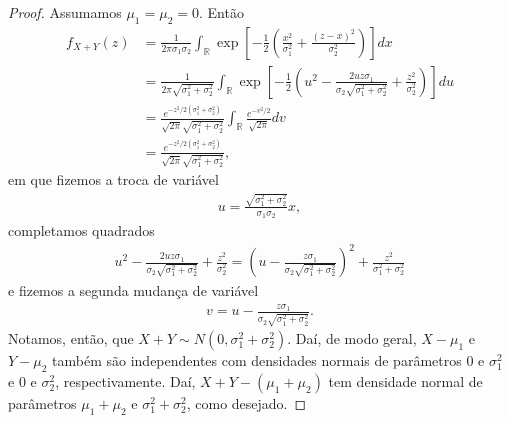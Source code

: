 \documentclass[../Notas.tex]{subfiles}
\begin{document}
\begin{proof}
Assumamos $\mu_1 = \mu_2 = 0$. Então
\begin{align*}
    f_{X+Y}(z) &= \frac{1}{2\pi\sigma_1\sigma_2}\int_{\mathbb{R}} \exp[ -\frac{1}{2}\left( \frac{x^2}{\sigma_1^2} + \frac{(z-x)^2}{\sigma_2^2} \right) ] dx \\
    &= \frac{1}{2\pi\sqrt{\sigma_1^2 + \sigma_2^2}}\int_{\mathbb{R}} \exp[ -\frac{1}{2}\left( u^2 - \frac{2uz\sigma_1}{\sigma_2\sqrt{\sigma_1^2 + \sigma_2^2}} + \frac{z^2}{\sigma_2^2} \right) ] du \\
    &= \frac{ e^{-z^2/2(\sigma_1^2+\sigma_2^2)} }{ \sqrt{2\pi}\sqrt{\sigma_1^2 + \sigma_2^2} }\int_{\mathbb{R}} \frac{e^{-v^2/2}}{\sqrt{2\pi}} dv \\
    &= \frac{ e^{-z^2/2(\sigma_1^2+\sigma_2^2)} }{ \sqrt{2\pi}\sqrt{\sigma_1^2 + \sigma_2^2} },
\end{align*}
em que fizemos a troca de variável
\begin{align*}
    u = \frac{\sqrt{\sigma_1^2 + \sigma_2^2}}{\sigma_1\sigma_2} x,
\end{align*}
completamos quadrados
\begin{align*}
    u^2 - \frac{2uz\sigma_1}{\sigma_2\sqrt{\sigma_1^2 + \sigma_2^2}} + \frac{z^2}{\sigma_2^2} = \left( u - \frac{z\sigma_1}{\sigma_2\sqrt{\sigma_1^2 + \sigma_2^2}} \right)^2 + \frac{z^2}{\sigma_1^2 + \sigma_2^2}
\end{align*}
e fizemos a segunda mudança de variável
\begin{align*}
    v = u - \frac{z\sigma_1}{\sigma_2\sqrt{\sigma_1^2 + \sigma_2^2}}.
\end{align*}
Notamos, então, que $X+Y\sim N(0, \sigma_1^2 + \sigma_2^2)$. Daí, de modo geral, $X-\mu_1$ e $Y-\mu_2$ também são independentes com densidades normais de parâmetros $0$ e $\sigma_1^2$ e $0$ e $\sigma_2^2$, respectivamente. Daí, $X+Y - (\mu_1 + \mu_2)$ tem densidade normal de parâmetros $\mu_1 + \mu_2$ e $\sigma_1^2 + \sigma_2^2$, como desejado.
\end{proof}
\end{document}
